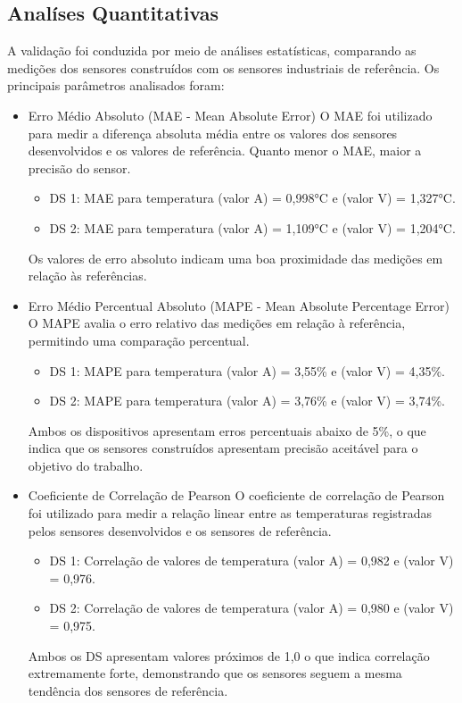 	


	\subsection{Analíses Quantitativas}
	
	A validação foi conduzida por meio de análises estatísticas, comparando as medições dos sensores construídos com os sensores industriais de referência. Os principais parâmetros analisados foram:


	\begin{itemize}
		\item  Erro Médio Absoluto (MAE - Mean Absolute Error)
		\tab O \acrshort{MAE} foi utilizado para medir a diferença absoluta média entre os valores dos sensores desenvolvidos e os valores de referência. Quanto menor o \acrshort{MAE}, maior a precisão do sensor.
			\begin{itemize}
				\item \acrshort{DS} 1: \acrshort{MAE} para temperatura (valor A) = 0,998°C e (valor V) = 1,327°C.
				\item \acrshort{DS} 2: \acrshort{MAE} para temperatura (valor A) = 1,109°C e (valor V) = 1,204°C.
			\end{itemize}
		\indent Os valores de erro absoluto indicam uma boa proximidade das medições em relação às referências.

		\item Erro Médio Percentual Absoluto (MAPE - Mean Absolute Percentage Error)
		\tab O \acrshort{MAPE} avalia o erro relativo das medições em relação à referência, permitindo uma comparação percentual.
		\begin{itemize}
			\item \acrshort{DS} 1: \acrshort{MAPE} para temperatura (valor A) = 3,55\% e (valor V) = 4,35\%.
			\item \acrshort{DS} 2: \acrshort{MAPE} para temperatura (valor A) = 3,76\% e (valor V) = 3,74\%.
		\end{itemize}
		\indent Ambos os dispositivos apresentam erros percentuais abaixo de 5\%, o que indica que os sensores construídos apresentam precisão aceitável para o objetivo do trabalho.
		
		\item Coeficiente de Correlação de Pearson
		\tab O coeficiente de correlação de Pearson foi utilizado para medir a relação linear entre as temperaturas registradas pelos sensores desenvolvidos e os sensores de referência.
		\begin{itemize}
			\item \acrshort{DS} 1: Correlação de valores de temperatura (valor A) = 0,982 e (valor V) = 0,976.
			\item \acrshort{DS} 2: Correlação de valores de temperatura (valor A) = 0,980 e (valor V) = 0,975.
		\end{itemize}
		\indent Ambos os \acrshort{DS} apresentam valores próximos de 1,0 o que indica correlação extremamente forte, demonstrando que os sensores seguem a mesma tendência dos sensores de referência.


\end{itemize}
